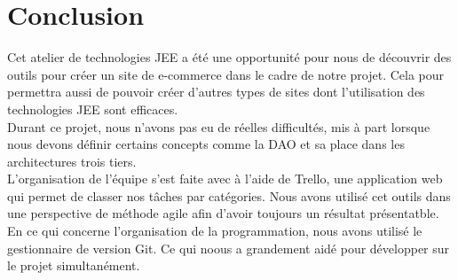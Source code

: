 \section{Conclusion}

Cet atelier de technologies JEE a été une opportunité pour nous de découvrir 
des outils pour créer un site de e-commerce dans le cadre de notre projet. Cela 
pour permettra aussi de pouvoir créer d'autres types de sites dont l'utilisation 
des technologies JEE sont efficaces. \\

Durant ce projet, nous n'avons pas eu de réelles difficultés, mis à part 
lorsque nous devons définir certains concepts comme la DAO et sa place dans 
les architectures trois tiers. \\

L'organisation de l'équipe s'est faite avec à l'aide de Trello, une application 
web qui permet de classer nos tâches par catégories. Nous avons utilisé cet 
outils dans une perspective de méthode agile afin d'avoir toujours un résultat 
présentatble. En ce qui concerne l'organisation de la programmation, nous 
avons utilisé le gestionnaire de version Git. Ce qui noous a grandement aidé 
pour développer sur le projet simultanément.
